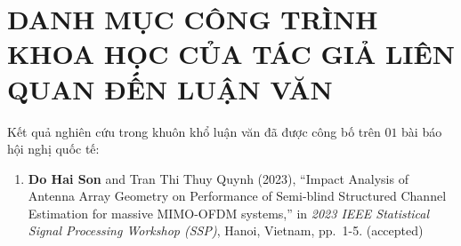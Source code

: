 \clearpage
{}

\chapter*{DANH MỤC CÔNG TRÌNH KHOA HỌC CỦA TÁC GIẢ LIÊN QUAN ĐẾN LUẬN VĂN}

Kết quả nghiên cứu trong khuôn khổ luận văn đã được công bố trên $01$ bài báo hội nghị quốc tế:
\begin{enumerate}
    \item \textbf{Do Hai Son} and Tran Thi Thuy Quynh (2023), ``Impact Analysis of Antenna Array Geometry on Performance of Semi-blind Structured Channel Estimation for massive MIMO-OFDM systems,'' in \textit{2023 IEEE Statistical Signal Processing Workshop (SSP)}, Hanoi, Vietnam, pp.~1-5. (accepted)
\end{enumerate}